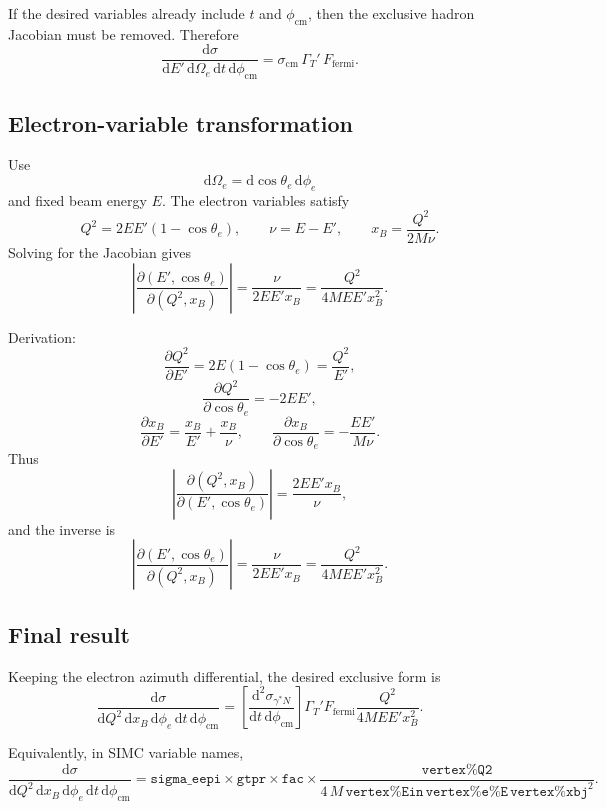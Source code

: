 \documentclass[11pt]{article}
\newcommand{\dd}{\mathrm{d}}
\newcommand{\phicm}{\phi_{\mathrm{cm}}}
\newcommand{\xb}{x_B}
\newcommand{\Qsq}{Q^2}
\newcommand{\Ebeam}{E}
\newcommand{\Escat}{E'}
\newcommand{\Mtar}{M}
\begin{document}
If the desired variables already include \(t\) and \(\phicm\), then the
exclusive hadron Jacobian must be removed.  Therefore
\[
  \frac{\dd\sigma}
       {\dd \Escat\,\dd\Omega_e\,\dd t\,\dd\phicm}
  =
  \sigma_{\mathrm{cm}}\,
  \Gamma_T'\,
  F_{\mathrm{fermi}}.
\]

\subsection{Electron-variable transformation}

Use
\[
  \dd\Omega_e = \dd\cos\theta_e\,\dd\phi_e
\]
and fixed beam energy \(\Ebeam\).  The electron variables satisfy
\[
  \Qsq = 2\Ebeam\Escat(1-\cos\theta_e),
  \qquad
  \nu = \Ebeam-\Escat,
  \qquad
  \xb = \frac{\Qsq}{2\Mtar\nu}.
\]
Solving for the Jacobian gives
\[
  \left|
  \frac{\partial(\Escat,\cos\theta_e)}
       {\partial(\Qsq,\xb)}
  \right|
  =
  \frac{\nu}{2\Ebeam\Escat\xb}
  =
  \frac{\Qsq}{4\Mtar\Ebeam\Escat\xb^2}.
\]

Derivation:
\[
  \frac{\partial \Qsq}{\partial \Escat}
  =
  2\Ebeam(1-\cos\theta_e)
  =
  \frac{\Qsq}{\Escat},
\]
\[
  \frac{\partial \Qsq}{\partial \cos\theta_e}
  =
  -2\Ebeam\Escat,
\]
\[
  \frac{\partial \xb}{\partial \Escat}
  =
  \frac{\xb}{\Escat}+\frac{\xb}{\nu},
  \qquad
  \frac{\partial \xb}{\partial\cos\theta_e}
  =
  -\frac{\Ebeam\Escat}{\Mtar\nu}.
\]
Thus
\[
  \left|
  \frac{\partial(\Qsq,\xb)}
       {\partial(\Escat,\cos\theta_e)}
  \right|
  =
  \frac{2\Ebeam\Escat\xb}{\nu},
\]
and the inverse is
\[
  \left|
  \frac{\partial(\Escat,\cos\theta_e)}
       {\partial(\Qsq,\xb)}
  \right|
  =
  \frac{\nu}{2\Ebeam\Escat\xb}
  =
  \frac{\Qsq}{4\Mtar\Ebeam\Escat\xb^2}.
\]

\subsection{Final result}

Keeping the electron azimuth differential, the desired exclusive form is
\[
  \boxed{
  \frac{\dd\sigma}
       {\dd \Qsq\,\dd\xb\,\dd\phi_e\,\dd t\,\dd\phicm}
  =
  \left[
    \frac{\dd^2\sigma_{\gamma^*N}}
         {\dd t\,\dd\phicm}
  \right]
  \Gamma_T'
  F_{\mathrm{fermi}}
  \frac{\Qsq}{4\Mtar\Ebeam\Escat\xb^2}
  }.
\]

Equivalently, in SIMC variable names,
\[
  \boxed{
  \frac{\dd\sigma}
       {\dd \Qsq\,\dd\xb\,\dd\phi_e\,\dd t\,\dd\phicm}
  =
  \texttt{sigma\_eepi}
  \times
  \texttt{gtpr}
  \times
  \texttt{fac}
  \times
  \frac{\texttt{vertex\%Q2}}
       {4\,M\,\texttt{vertex\%Ein}\,\texttt{vertex\%e\%E}\,\texttt{vertex\%xbj}^2}
  }.
\]
\end{document}
